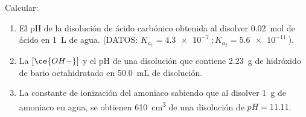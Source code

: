Calcular:
\begin{enumerate}[label={\alph*)},font={\color{red!50!black}\bfseries}]
	\item El pH de la disolución de ácido carbónico obtenida al disolver \SI{0,02}{\mol} de ácido en \SI{1}{\liter} de agua. (DATOS: $K_{a_1} = \SI{4,3e-7}{}; K_{a_2} = \SI{5,6e-11}{}$).
	\item La $[\ce{OH-}]$ y el pH de una disolución que contiene \SI{2,23}{\gram} de hidróxido de bario octahidratado en \SI{50,0}{\milli\liter} de disolución.
	\item La constante de ionización del amoniaco sabiendo que al disolver \SI{1}{\gram} de amoniaco en agua, se obtienen \SI{610}{\cubic\centi\meter} de una disolución de $pH = \num{11,11}$.
\end{enumerate}

